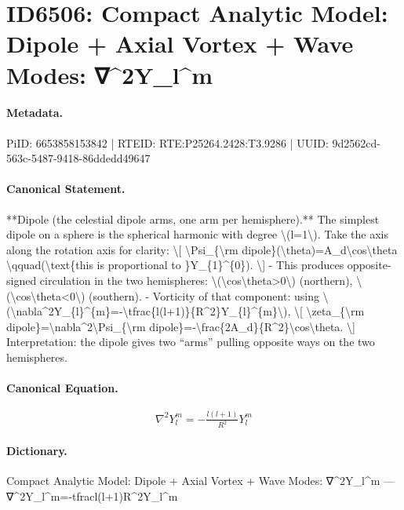\section*{ID6506: Compact Analytic Model: Dipole + Axial Vortex + Wave Modes: ∇\textasciicircum{}2Y\_l\textasciicircum{}m}
\paragraph{Metadata.}
PiID: 6653858153842 | RTEID: RTE:P25264.2428:T3.9286 | UUID: 9d2562cd-563c-5487-9418-86ddedd49647

\paragraph{Canonical Statement.}
**Dipole (the celestial dipole arms, one arm per hemisphere).** The simplest dipole on a sphere is the spherical harmonic with degree \textbackslash{}(l=1\textbackslash{}). Take the axis along the rotation axis for clarity: \textbackslash{}[ \textbackslash{}Psi\_\{\textbackslash{}rm dipole\}(\textbackslash{}theta)=A\_d\textbackslash{}cos\textbackslash{}theta \textbackslash{}qquad(\textbackslash{}text\{this is proportional to \}Y\_\{1\}\textasciicircum{}\{0\}). \textbackslash{}] - This produces opposite-signed circulation in the two hemispheres: \textbackslash{}(\textbackslash{}cos\textbackslash{}theta>0\textbackslash{}) (northern), \textbackslash{}(\textbackslash{}cos\textbackslash{}theta<0\textbackslash{}) (southern). - Vorticity of that component: using \textbackslash{}(\textbackslash{}nabla\textasciicircum{}2Y\_\{l\}\textasciicircum{}\{m\}=-\textbackslash{}tfrac\{l(l+1)\}\{R\textasciicircum{}2\}Y\_\{l\}\textasciicircum{}\{m\}\textbackslash{}), \textbackslash{}[ \textbackslash{}zeta\_\{\textbackslash{}rm dipole\}=\textbackslash{}nabla\textasciicircum{}2\textbackslash{}Psi\_\{\textbackslash{}rm dipole\}=-\textbackslash{}frac\{2A\_d\}\{R\textasciicircum{}2\}\textbackslash{}cos\textbackslash{}theta. \textbackslash{}] Interpretation: the dipole gives two “arms” pulling opposite ways on the two hemispheres.

\paragraph{Canonical Equation.}
\[
\nabla^2Y_{l}^{m}=-\tfrac{l(l+1)}{R^2}Y_{l}^{m}
\]

\paragraph{Dictionary.}
Compact Analytic Model: Dipole + Axial Vortex + Wave Modes: ∇\textasciicircum{}2Y\_l\textasciicircum{}m — ∇\textasciicircum{}2Y\_l\textasciicircum{}m=-tfracl(l+1)R\textasciicircum{}2Y\_l\textasciicircum{}m

